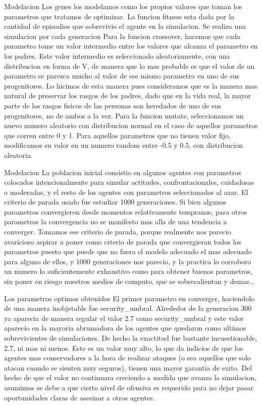 \documentclass{beamer}
\begin{document}
\begin{frame}{Modelacion}
    Los genes los modelamos como los propios valores que toman los parametros que tratamos de optimizar.
    La funcion fitness esta dada por la cantidad de episodios que sobrevivio el agente en la simulacion. Se realiza una simulacion por cada generacion
    Para la funcion crossover, hacemos que cada parametro tome un valor intermedio entre los valores que alcanza el parametro en los padres. Este valor intermedio es seleccionado aleatoriamente, con una distribucion en forma de V, de manera que lo mas probable es que el valor de un parametro se parezca mucho al valor de ese mismo parametro en uno de sus progenitores. Lo hicimos de esta manera pues consideramos que es la manera mas natural de preservar los rasgos de los padres, dado que en la vida real, la mayor parte de los rasgos fisicos de las personas son heredados de uno de sus progenitores, no de ambos a la vez.
    Para la funcion mutate, seleccionamos un nuevo numero aleatorio con distribucion normal en el caso de aquellos parametros que corren entre 0 y 1. Para aquellos parametros que no tienen valor fijo, modificamos su valor en un numero random entre -0.5 y 0.5, con distribucion aleatoria.
\end{frame}

\begin{frame}{Modelacion}
    La poblacion inicial consistio en algunos agentes con parametros colocados intencionalmente para simular actitudes, confrontacionales, cuidadosas o moderadas, y el resto de los agentes con parametros seleccionados al azar.
    El criterio de parada usado fue estudiar 1000 generaciones. Si bien algunos parametros convergieron desde momentos relativamente tempranos, para otros parametros la convergencia no se manifesto mas alla de una tendencia a converger. Tomamos ese criterio de parada, porque realmente nos parecio avaricioso aspirar a poner como crterio de parada que convergieran todos los parametros puesto que puede que no fuera el modelo adecuado el mas adecuado para alguno de ellos, y 1000 generaciones nos parecio, y la practica lo corroboro un numero lo suficientemente exhaustivo como para obtener buenos parametros, sin poner en riesgo nuestros medios de computo, que se sobrecalientan y demas...
\end{frame}

\begin{frame}{Los parametros optimos obtenidos}
    El primer parametro en converger, haciendolo de una manera inobjetable fue security_umbral. Alrededor de la generacion 300 ya aparecia de manera regular el valor 2.7 como security_umbral y este valor aparecio en la mayoria abrumadora de los agentes que quedaron como ultimos sobrevivientes de simulaciones. De hecho la exactitud fue bastante incuestionable, 2.7, ni mas ni menos. Este es un valor muy alto, lo que da indicios de que los agentes mas conservadores a la hora de realizar ataques (o sea aquellos que solo atacan cuando se sienten muy seguros), tienen una mayor garantia de exito. Del hecho de que el valor no continuara creciendo a medida que avanzo la simulacion, asumimos se debe a que cierto nivel de ofensiva es requerido para no dejar pasar oportunidades claras de asesinar a otros agentes.
\end{frame}
\end{document}
